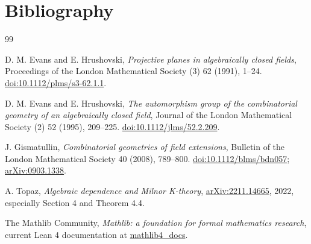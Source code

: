 \documentclass[11pt,oneside]{article}
\theoremstyle{definition}
\theoremstyle{remark}
\begin{document}
\clearpage
\section{Bibliography}

\begin{thebibliography}{99}

D. M. Evans and E. Hrushovski,
\emph{Projective planes in algebraically closed fields},
Proceedings of the London Mathematical Society (3) 62 (1991), 1--24.
\href{https://doi.org/10.1112/plms/s3-62.1.1}{doi:10.1112/plms/s3-62.1.1}.

D. M. Evans and E. Hrushovski,
\emph{The automorphism group of the combinatorial geometry of an algebraically closed field},
Journal of the London Mathematical Society (2) 52 (1995), 209--225.
\href{https://doi.org/10.1112/jlms/52.2.209}{doi:10.1112/jlms/52.2.209}.

J. Gismatullin,
\emph{Combinatorial geometries of field extensions},
Bulletin of the London Mathematical Society 40 (2008), 789--800.
\href{https://doi.org/10.1112/blms/bdn057}{doi:10.1112/blms/bdn057};
\href{https://arxiv.org/abs/0903.1338}{arXiv:0903.1338}.

A. Topaz,
\emph{Algebraic dependence and Milnor K-theory},
\href{https://arxiv.org/abs/2211.14665}{arXiv:2211.14665}, 2022,
especially Section 4 and Theorem 4.4.

The Mathlib Community,
\emph{Mathlib: a foundation for formal mathematics research},
current Lean 4 documentation at
\href{https://leanprover-community.github.io/mathlib4_docs/Mathlib/}{mathlib4\_docs}.

\end{thebibliography}
\end{document}
